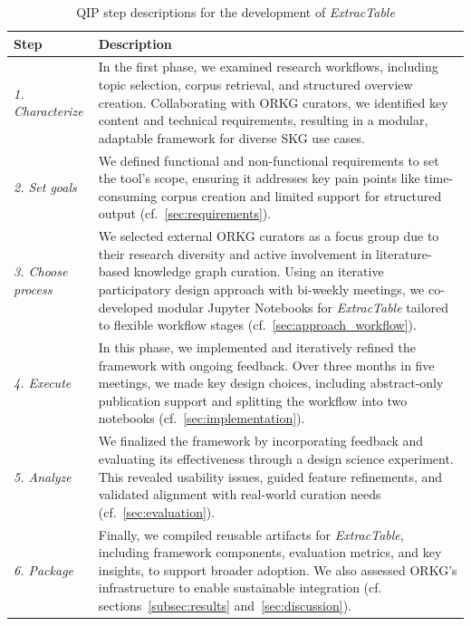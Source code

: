 \documentclass[runningheads]{llncs}
\newcommand*{\secref}[1]{\hyperref[{#1}]{\autoref*{#1}}}
\begin{document}
\begin{longtable}{p{} p{}}
\caption{QIP step descriptions for the development of \textit{ExtracTable}} \label{tab:qip_steps} \\
\toprule
\textbf{Step} & \textbf{Description} \\
\midrule
\endfirsthead
\endhead

\endfoot
\textit{1. Characterize} & In the first phase, we examined research workflows, including topic selection, corpus retrieval, and structured overview creation. Collaborating with ORKG curators, we identified key content and technical requirements, resulting in a modular, adaptable framework for diverse SKG use cases.\\\hline

\textit{2. Set goals} & We defined functional and non-functional requirements to set the tool’s scope, ensuring it addresses key pain points like time-consuming corpus creation and limited support for structured output (cf.~\secref{sec:requirements}).\\\hline

\textit{3. Choose process} & We selected external ORKG curators as a focus group due to their research diversity and active involvement in literature-based knowledge graph curation. Using an iterative participatory design approach with bi-weekly meetings, we co-developed modular Jupyter Notebooks for \textit{ExtracTable} tailored to flexible workflow stages (cf.~\secref{sec:approach_workflow}).\\\hline

\textit{4. Execute} & In this phase, we implemented and iteratively refined the framework with ongoing feedback. Over three months in five meetings, we made key design choices, including abstract-only publication support and splitting the workflow into two notebooks (cf.~\secref{sec:implementation}). \\\hline

\textit{5. Analyze} & We finalized the framework by incorporating feedback and evaluating its effectiveness through a design science experiment. This revealed usability issues, guided feature refinements, and validated alignment with real-world curation needs (cf.~\secref{sec:evaluation}). \\\hline

\textit{6. Package} & Finally, we compiled reusable artifacts for \textit{ExtracTable}, including framework components, evaluation metrics, and key insights, to support broader adoption. We also assessed ORKG’s infrastructure to enable sustainable integration (cf. sections~\ref{subsec:results} and~\ref{sec:discussion}).\\
\end{longtable}
\end{document}
